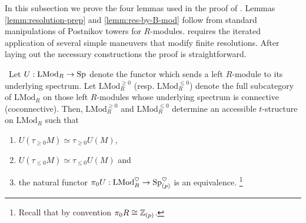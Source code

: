 In this subsection we prove the four lemmas used in the proof of .
Lemmas \ref{lemm:resolution-prep} and \ref{lemm:res-by-B-mod} follow from standard manipulations of Postnikov towers for $R$-modules.  requires the iterated application of several simple maneuvers that modify finite resolutions. After laying out the necessary constructions the proof is straightforward. 

\begin{lem}[{\cite[Proposition 7.1.1.13]{HA}}]
  \label{lemm:truncate-modules}\
  Let $U : \mathrm{LMod}_R \to \operatorname{\mathrm{Sp}}$ denote the functor which sends a left $R$-module to its underlying spectrum. Let $\mathrm{LMod}_R^{\geq 0}$ (resp. $\mathrm{LMod}_R^{\leq 0}$) denote the full subcategory of $\mathrm{LMod}_R$ on those left $R$-modules whose underlying spectrum is connective (coconnective). Then, $\mathrm{LMod}_R^{\geq 0}$ and $\mathrm{LMod}_R^{\leq 0}$ determine an accessible $t$-structure on $\mathrm{LMod}_R$ such that
  \begin{enumerate}
  \item $U(\tau_{\geq 0}M) \simeq \tau_{\geq 0}U(M)$,
  \item $U(\tau_{\leq 0}M) \simeq \tau_{\leq 0}U(M)$ and
  \item the natural functor $\pi_0U : \mathrm{LMod}_R^\heartsuit \to \operatorname{\mathrm{Sp}}_{(p)}^\heartsuit$ is an equivalence. \footnote{Recall that by convention $\pi_0R \cong \mathbb{Z}_{(p)}$.}
  \end{enumerate}
\end{lem}


